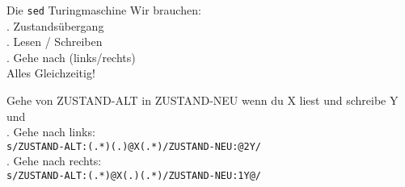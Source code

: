 \documentclass[aspectratio=169]{beamer}
\begin{document}
\begin{frame}{Die {\tt sed} Turingmaschine}
	Wir brauchen:\\. Zustands\"ubergang \\. Lesen / Schreiben \\. Gehe nach (links/rechts)\\\pause
	Alles Gleichzeitig!\\\pause

	Gehe von ZUSTAND-ALT in ZUSTAND-NEU wenn du X liest und schreibe Y und\\
	. Gehe nach links:\\\pause
	\texttt{s/ZUSTAND-ALT:(.*)(.)@X(.*)/ZUSTAND-NEU:@\bsl2Y/}\\\pause
	. Gehe nach rechts:\\\pause
	\texttt{s/ZUSTAND-ALT:(.*)@X(.)(.*)/ZUSTAND-NEU:\bsl1Y@/}\\
\end{frame}
\end{document}
